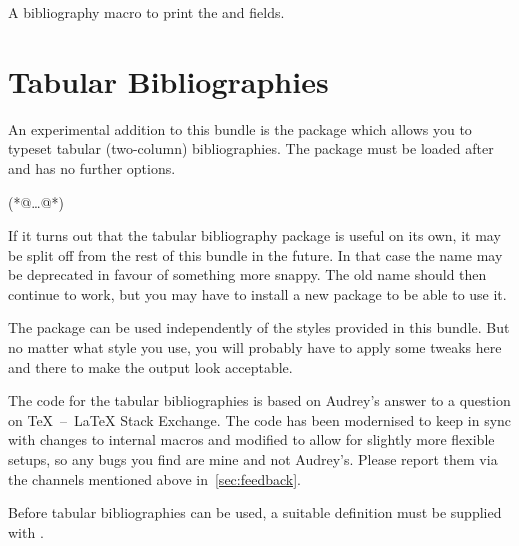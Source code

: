 \documentclass[DIV=9]{scrartcl}
\makeatletter
\def\tex{TeX}%
\def\latex{LaTeX}%
\newenvironment*{keymarglistbook}
  {\marglist
   \setlength{\itemsep}{0pt}%
   \raggedright
   \let\@@item\item
   \def\keyitem[##1]{%
     \@@item[{##1}]%
     \ltd@pdfbookmark{##1}{##1}}}
  {\endmarglist}
\let\exltd@pdfbookmark\ltd@pdfbookmark
\def\ltd@pdfbookmark#1#2{%
  \phantomsection\label{exltd@itm@#1}%
  \exltd@pdfbookmark{#1}{#2}}
\makeatother
\begin{document}
\begin{keymarglistbook}
\begin{biblatexcode}


\end{biblatexcode}

\keyitem[type+number]
A bibliography macro to print the  and  fields.
\end{keymarglistbook}

\clearpage
\section{Tabular Bibliographies}\label{sec:tabularbib}
\label{exltd@itm@biblatex-ext-tabular}
An experimental addition to this bundle is the package
 which allows you to typeset tabular
(two-column) bibliographies.
The package must be loaded after  and has no further options.
\begin{biblatexcode}
\usepackage[(*@@*)]{biblatex}
(*@\dots @*)
\usepackage{biblatex-ext-tabular}
\end{biblatexcode}
If it turns out that the tabular bibliography package is useful on its own,
it may be split off from the rest of this bundle in the future.
In that case the name  may be deprecated in favour
of something more snappy.
The old name should then continue to work, but you may have to install a new
package to be able to use it.

The package  can be used independently of the styles
provided in this bundle.
But no matter what style you use, you will probably have to apply some tweaks
here and there to make the output look acceptable.

The code for the tabular bibliographies is based on Audrey's%
answer to a question%
on \tex{}~--~\latex{} Stack Exchange.
The code has been modernised to keep in sync with changes to internal macros
and modified to allow for slightly more flexible setups, so any bugs you find
are mine and not Audrey's. Please report them via the channels mentioned above
in~\cref{sec:feedback}.

Before tabular bibliographies can be used, a suitable definition
must be supplied with .
\end{document}
